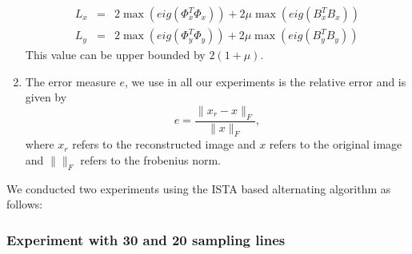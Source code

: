 \begin{enumerate}
\begin{eqnarray}
L_x &=& 2\max(eig( \Phi_x^T \Phi_x))  +  2 \mu \max(eig( B_x^T B_x)) \\
L_y &=& 2\max(eig( \Phi_y^T \Phi_y))  +  2\mu \max(eig( B_y^T B_y))
\end{eqnarray}This value can be upper bounded by $2(1 + \mu)$.
\item The error measure $e$, we use in all our experiments is the relative error and is given by
\begin{equation}
	e = \frac{\|x_r - x\|_F}{\|x \|_F},
\end{equation}
where $x_r$ refers to the reconstructed image and $x$ refers to the original image and $\| \|_F$ refers to the frobenius norm.
\end{enumerate}
We conducted two experiments using the ISTA based alternating algorithm as follows:

\subsubsection{Experiment with 30 and 20 sampling lines}

